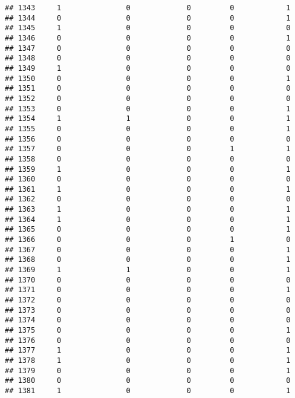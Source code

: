 \documentclass[]{article}
\begin{document}
\begin{verbatim}
## 1343     1               0             0         0            1
## 1344     0               0             0         0            1
## 1345     1               0             0         0            0
## 1346     0               0             0         0            1
## 1347     0               0             0         0            0
## 1348     0               0             0         0            0
## 1349     1               0             0         0            0
## 1350     0               0             0         0            1
## 1351     0               0             0         0            0
## 1352     0               0             0         0            0
## 1353     0               0             0         0            1
## 1354     1               1             0         0            1
## 1355     0               0             0         0            1
## 1356     0               0             0         0            0
## 1357     0               0             0         1            1
## 1358     0               0             0         0            0
## 1359     1               0             0         0            1
## 1360     0               0             0         0            0
## 1361     1               0             0         0            1
## 1362     0               0             0         0            0
## 1363     1               0             0         0            1
## 1364     1               0             0         0            1
## 1365     0               0             0         0            1
## 1366     0               0             0         1            0
## 1367     0               0             0         0            1
## 1368     0               0             0         0            1
## 1369     1               1             0         0            1
## 1370     0               0             0         0            0
## 1371     0               0             0         0            1
## 1372     0               0             0         0            0
## 1373     0               0             0         0            0
## 1374     0               0             0         0            0
## 1375     0               0             0         0            1
## 1376     0               0             0         0            0
## 1377     1               0             0         0            1
## 1378     1               0             0         0            1
## 1379     0               0             0         0            1
## 1380     0               0             0         0            0
## 1381     1               0             0         0            1

\end{verbatim}
\end{document}
